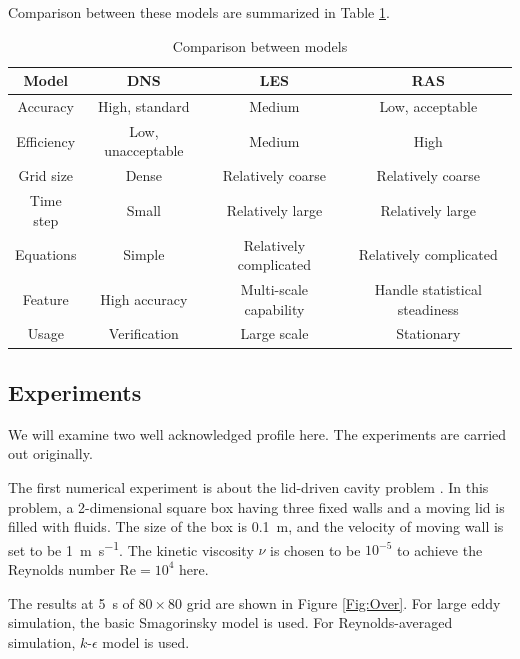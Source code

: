 \documentclass[english, nochinese]{pkupaper}
\begin{document}
Comparison between these models are summarized in Table \ref{Tbl:Comp}.

\begin{table}[htbp]
\centering
\caption{Comparison between models}
\label{Tbl:Comp}
\begin{tabular}{|c|c|c|c|}
\hline
Model & DNS & LES & RAS \\
\hline
Accuracy & High, standard & Medium & Low, acceptable \\
\hline
Efficiency & Low, unacceptable & Medium & High \\
\hline
Grid size & Dense & Relatively coarse & Relatively coarse \\
\hline
Time step & Small & Relatively large & Relatively large \\
\hline
Equations & Simple & Relatively complicated & Relatively complicated \\
\hline
Feature & High accuracy & Multi-scale capability & Handle statistical steadiness \\
\hline
Usage & Verification & Large scale & Stationary \\
\hline
\end{tabular}
\end{table}

\subsection{Experiments}

We will examine two well acknowledged profile here. The experiments are carried out originally.

The first numerical experiment is about the lid-driven cavity problem \parencite{bruneau_2d_2006}. In this problem, a 2-dimensional square box having three fixed walls and a moving lid is filled with fluids. The size of the box is \SI{0.1}{\meter}, and the velocity of moving wall is set to be \SI{1}{\meter\per\second}. The kinetic viscosity $\nu$ is chosen to be $10^{-5}$\Si{\meter\squared\per\second} to achieve the Reynolds number $ \mathrm{Re} = 10^4 $ here.

The results at \SI{5}{s} of $ 80 \times 80 $ grid are shown in Figure \ref{Fig:Over}. For large eddy simulation, the basic Smagorinsky model is used. For Reynolds-averaged simulation, $k$-$\epsilon$ model is used.
\end{document}
